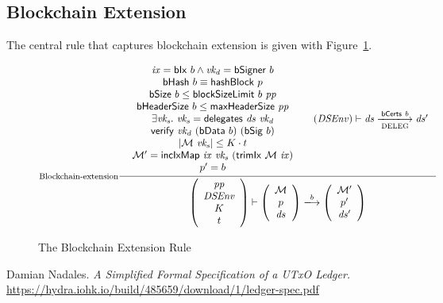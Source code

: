 \documentclass[11pt,a4paper]{article}
\newcommand{\var}[1]{\mathit{#1}}
\newcommand{\fun}[1]{\mathsf{#1}}
\newcommand{\size}[1]{\left| #1 \right|}
\newcommand{\trans}[2]{\xlongrightarrow[\textsc{#1}]{#2}}
\newcommand{\hashname}{bHash}
\newcommand{\bsizename}{bSize}
\newcommand{\bhdrsizename}{bHeaderSize}
\newcommand{\verifyname}{verify}
\newcommand{\delegationname}{delegates} %
\newcommand{\signmapname}{\mathcal{M}}
\newcommand{\trimixname}{trimIx}
\newcommand{\incixmapname}{incIxMap}
\newcommand{\hashofblockname}{hashBlock}
\newcommand{\blocksizelimitname}{blockSizeLimit}
\newcommand{\maxheadersizename}{maxHeaderSize}
\newcommand{\bdataname}{bData}
\newcommand{\bcertsname}{bCerts}
\newcommand{\bsigname}{bSig}
\newcommand{\bixname}{bIx}
\newcommand{\bsignername}{bSigner}
\newcommand{\verify}[3]{\fun{\verifyname} ~ #1 ~ #2 ~ #3}
\newcommand{\hash}[1]{\fun{\hashname}\ #1}
\newcommand{\bsize}[1]{\fun{\bsizename} ~ #1}
\newcommand{\bhdrsize}[1]{\fun{\bhdrsizename} ~ #1}
\newcommand{\delegation}[2]{\fun{\delegationname} ~ #1 ~ #2}
\newcommand{\signmap}[1]{\fun{\signmapname} ~ #1}
\newcommand{\trimix}[2]{\fun{\trimixname} ~ #1 ~ #2}
\newcommand{\incixmap}[3]{\fun{\incixmapname} ~ #1 ~ #2 ~ #3}
\newcommand{\hashofblock}[1]{\fun{\hashofblockname} ~ #1}
\newcommand{\blocksizelimit}[2]{\fun{\blocksizelimitname} ~ #1 ~ #2}
\newcommand{\maxheadersize}[1]{\fun{\maxheadersizename} ~ #1}
\newcommand{\bdata}[1]{\fun{\bdataname} ~ #1}
\newcommand{\bcerts}[1]{\fun{\bcertsname} ~ #1}
\newcommand{\bsig}[1]{\fun{\bsigname} ~ #1}
\newcommand{\bix}[1]{\fun{\bixname} ~ #1}
\newcommand{\bsigner}[1]{\fun{\bsignername} ~ #1}
\begin{document}
\subsection{Blockchain Extension}
\label{sec:chain-extension}

The central rule that captures blockchain extension is given with
Figure~\ref{fig:blockchain-extension}.

\begin{figure}
  \begin{equation*}
  \inference[Blockchain-extension]
  {
    {\begin{array}{c}
      \var{ix} = \bix{b} \wedge \var{vk_d} = \bsigner{b} \\
      \hash{b} \equiv \hashofblock{p} \\
      \bsize{b} \leq \blocksizelimit{b}{\var{pp}} \\
      \bhdrsize{b} \leq \maxheadersize{\var{pp}} \\
      \exists \var{\var{vk_s}}.~\var{vk_s} = \delegation{\var{ds}}{\var{vk_d}} \\
      \verify{\var{vk_d}}{(\bdata{b})}{(\bsig{b})} \\
      \size{\signmap{\var{vk_s}}} \leq K \cdot t \\
      \signmapname' = \incixmap{\var{ix}}{\var{vk_s}}{(\trimix{\signmapname}{\var{ix}})} \\
      p' = b
     \end{array}}
   & (\var{DSEnv}) \vdash \var{ds} \trans{\text{DELEG}}{\bcerts{b}} \var{ds'}
  }
  {
    \left(
      {\begin{array}{c}
         \var{pp} \\
         \var{DSEnv} \\
         K \\
         t
       \end{array}}
    \right)
    \vdash
    \left(
      {\begin{array}{c}
         \signmapname \\
         p \\
         \var{ds}
       \end{array}}
    \right)
    \trans{}{b}
    \left(
      {\begin{array}{c}
         \signmapname' \\
         p' \\
         \var{ds'}
       \end{array}}
    \right)
 }
  \end{equation*}
  \caption{The Blockchain Extension Rule}
  \label{fig:blockchain-extension}
\end{figure}

\begin{thebibliography}{1}
  Damian Nadales.
  \textit{A Simplified Formal Specification of a UTxO Ledger.} \\
  \url{https://hydra.iohk.io/build/485659/download/1/ledger-spec.pdf}
\end{thebibliography}
\end{document}
